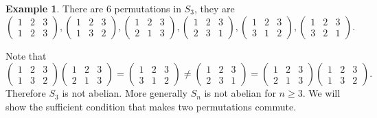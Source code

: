 \documentclass[12pt]{book}
\theoremstyle{definition}
\newtheorem{example}{Example}[section]
\theoremstyle{remark}
\begin{document}
				\begin{example}
					There are 6 permutations in $S_3$, they are
					\begin{equation*}
					\begin{pmatrix}
					1 & 2 & 3\\
					1 & 2 & 3
					\end{pmatrix}, 
					\begin{pmatrix}
					1 & 2 & 3\\
					1 & 3 & 2
					\end{pmatrix}, 
					\begin{pmatrix}
					1 & 2 & 3\\
					2 & 1 & 3
					\end{pmatrix}, 
					\begin{pmatrix}
					1 & 2 & 3\\
					2 & 3 & 1
					\end{pmatrix}, 
					\begin{pmatrix}
					1 & 2 & 3\\
					3 & 1 & 2
					\end{pmatrix},
					\begin{pmatrix}
					1 & 2 & 3\\
					3 & 2 & 1
					\end{pmatrix}.
					\end{equation*}
				\end{example}
			Note that
			\begin{equation*}
				\begin{pmatrix}
					1 & 2 & 3 \\
					1 & 3 & 2
				\end{pmatrix}
				\begin{pmatrix}
				1 & 2 & 3 \\
				2 & 1 & 3
				\end{pmatrix}
				= \begin{pmatrix}
				1 & 2 & 3 \\
				3 & 1 & 2
				\end{pmatrix}
				\neq
				\begin{pmatrix}
				1 & 2 & 3 \\
				2 & 3 & 1
				\end{pmatrix}
				= 	\begin{pmatrix}
				1 & 2 & 3 \\
				2 & 1 & 3
				\end{pmatrix}
				\begin{pmatrix}
				1 & 2 & 3 \\
				1 & 3 & 2
				\end{pmatrix}.
			\end{equation*}
			Therefore $S_3$ is not abelian. More generally $S_n$ is not abelian for $n \geq 3$. We will show the sufficient condition that makes two permutations commute.
			
\end{document}
